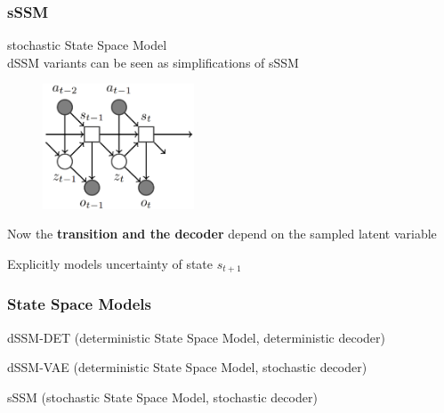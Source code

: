 \begin{frame}
	\frametitle{sSSM}
	\vspace{-10mm}
	stochastic State Space Model\\
	dSSM variants can be seen as simplifications of sSSM \\
	\begin{multicols}{2}
		\begin{figure}[h]
			\includegraphics[width=0.4\textwidth]{./latent_i2a_images/sSSM2.png}	
		\end{figure}
		\columnbreak
		\begin{PraesentationAufzaehlung}
			\item Now the \textbf{transition and the decoder} depend on the sampled latent variable
			\item Explicitly models uncertainty of state $s_{t+1}$
		\end{PraesentationAufzaehlung}
	\end{multicols}
\end{frame}


\begin{frame}
	\frametitle{State Space Models}
	\begin{PraesentationAufzaehlung}
		\item dSSM-DET  (deterministic State Space Model, deterministic decoder) 
		\vspace{10mm}
		\item dSSM-VAE (deterministic State Space Model, stochastic decoder)
		\vspace{10mm}
		\item sSSM (stochastic State Space Model, stochastic decoder)
	\end{PraesentationAufzaehlung}
\end{frame}

